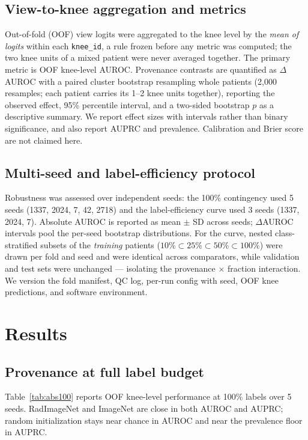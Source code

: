\documentclass[conference]{IEEEtran}
\begin{document}
\subsection{View-to-knee aggregation and metrics}
Out-of-fold (OOF) view logits were aggregated to the knee level by the \emph{mean of
logits} within each \texttt{knee\_id}, a rule frozen before any metric was computed;
the two knee units of a mixed patient were never averaged together. The primary
metric is OOF knee-level AUROC. Provenance contrasts are quantified as $\Delta$AUROC
with a paired cluster bootstrap resampling whole patients (2{,}000 resamples; each
patient carries its 1--2 knee units together), reporting the observed effect, 95\%
percentile interval, and a two-sided bootstrap $p$ as a descriptive summary. We report
effect sizes with intervals rather than binary significance, and also report AUPRC and
prevalence. Calibration and Brier score are not claimed here.

\subsection{Multi-seed and label-efficiency protocol}
Robustness was assessed over independent seeds: the 100\% contingency used 5 seeds
(1337, 2024, 7, 42, 2718) and the label-efficiency curve used 3 seeds (1337, 2024,
7). Absolute AUROC is reported as mean $\pm$ SD across seeds; $\Delta$AUROC intervals
pool the per-seed bootstrap distributions. For the curve, nested class-stratified
subsets of the \emph{training} patients ($10\%\subset25\%\subset50\%\subset100\%$)
were drawn per fold and seed and were identical across comparators, while validation
and test sets were unchanged --- isolating the provenance $\times$ fraction
interaction. We version the fold manifest, QC log, per-run config with seed, OOF knee
predictions, and software environment.

\section{Results}

\subsection{Provenance at full label budget}
Table~\ref{tab:abs100} reports OOF knee-level performance at 100\% labels over 5
seeds. RadImageNet and ImageNet are close in both AUROC and AUPRC; random
initialization stays near chance in AUROC and near the prevalence floor in AUPRC.
\end{document}
